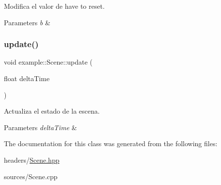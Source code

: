 Modifica el valor de have to reset. 


\begin{DoxyParams}{Parameters}
{\em b} & \\
\hline
\end{DoxyParams}
\mbox{\label{classexample_1_1_scene_a0e90063ee88a217dac88ab964a7dab74}} 
\subsubsection{\texorpdfstring{update()}{update()}}
{\footnotesize\ttfamily void example\+::\+Scene\+::update (\begin{DoxyParamCaption}\item[{float}]{delta\+Time }\end{DoxyParamCaption})}



Actualiza el estado de la escena. 


\begin{DoxyParams}{Parameters}
{\em delta\+Time} & \\
\hline
\end{DoxyParams}


The documentation for this class was generated from the following files\+:\begin{DoxyCompactItemize}
\item 
headers/\mbox{\hyperlink{_scene_8hpp}{Scene.\+hpp}}\item 
sources/Scene.\+cpp\end{DoxyCompactItemize}

